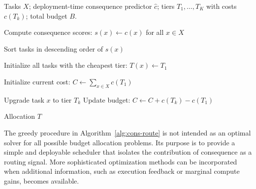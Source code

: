 \documentclass{article}
\begin{document}
\begin{algorithm}[t]
\caption{Deployment-time consequence-only compute allocation}
\label{alg:cons-route}
\begin{algorithmic}[1]
\REQUIRE Tasks $X$; deployment-time consequence predictor $\hat{c}$;
tiers $T_1,\ldots,T_K$ with costs $c(T_k)$; total budget $B$.

\STATE Compute consequence scores:
$s(x)\leftarrow\hat{c}(x)$ for all $x\in X$

\STATE Sort tasks in descending order of $s(x)$

\STATE Initialize all tasks with the cheapest tier:
$T(x)\leftarrow T_1$

\STATE Initialize current cost:
$C\leftarrow\sum_{x\in X}c(T_1)$

            \STATE Upgrade task $x$ to tier $T_k$
            \STATE Update budget:
            $C\leftarrow C+c(T_k)-c(T_1)$
        \ENDIF
    \ENDFOR
\ENDFOR

\RETURN Allocation $T$
\end{algorithmic}
\end{algorithm}

The greedy procedure in Algorithm~\ref{alg:cons-route}  is not intended as an optimal solver for all
possible budget allocation problems. Its purpose is to provide a
simple and deployable scheduler that isolates the contribution of
consequence as a routing signal. More sophisticated optimization
methods can be incorporated when additional information, such as
execution feedback or marginal compute gains, becomes available.
\end{document}
